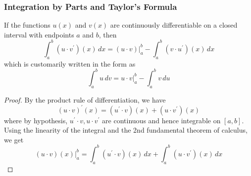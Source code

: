 \documentclass{article}
\begin{document}
      \subsubsection{Integration by Parts and Taylor's Formula}
      \begin{theorem}
      If the functions $u(x)$ and $v(x)$ are continuously differentiable on a closed interval with endpoints $a$ and $b$, then
      \[\int_a^b (u \cdot v^\prime)(x)\,dx = (u \cdot v)\big|^b_a - \int_a^b (v \cdot u^\prime)(x)\,dx\]
      which is customarily written in the form as
      \[\int_a^b u\,dv = u \cdot v \big|_a^b - \int_a^b v\,du\]
      \end{theorem}
      \begin{proof}
      By the product rule of differentiation, we have
      \[(u \cdot v)^\prime (x) = (u^\prime \cdot v)(x) + (u \cdot v^\prime) (x)\]
      where by hypothesis, $u^\prime \cdot v, u \cdot v^\prime$ are continuous and hence integrable on $[a, b]$. Using the linearity of the integral and the 2nd fundamental theorem of calculus, we get
      \[(u \cdot v) (x) \big|^b_a = \int_a^b (u^\prime \cdot v)(x)\,dx + \int_a^b (u \cdot v^\prime) (x)\,dx\]
      \end{proof}
\end{document}
